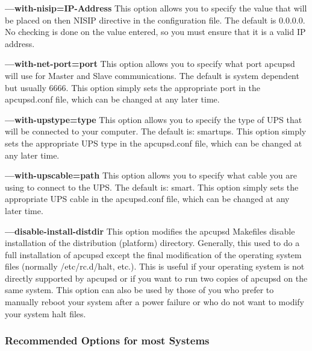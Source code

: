 \begin{description}
\item {\bf {---}with-nisip=\lt{}IP-Address\gt{}}
This option allows you to specify the value that will be placed on then NISIP
directive in the configuration file. The default is 0.0.0.0. No checking is
done on the value entered, so you must ensure that it is a valid IP address.  

\item {\bf {---}with-net-port=\lt{}port\gt{}}
This option allows you to specify what port apcupsd will use for Master and
Slave communications. The default is system dependent but usually 6666. This
option simply sets the appropriate port in the apcupsd.conf file, which can be
changed at any later time.  

\item {\bf {---}with-upstype=\lt{}type\gt{}}
This option allows you to specify the type of UPS that will be connected to
your computer. The default is: smartups. This option simply sets the
appropriate UPS type in the apcupsd.conf file, which can be changed at any
later time.  

\item {\bf {---}with-upscable=\lt{}path\gt{}}
This option allows you to specify what cable you are using to connect to the
UPS. The default is: smart. This option simply sets the appropriate UPS cable
in the apcupsd.conf file, which can be changed at any later time.  

\item {\bf {---}disable-install-distdir}
This option modifies the apcupsd Makefiles disable installation of the
distribution (platform) directory. Generally, this used to do a full
installation of apcupsd except the final modification of the operating system
files (normally /etc/rc.d/halt, etc.). This is useful if your operating system
is not directly supported by apcupsd or if you want to run two copies of
apcupsd on the same system. This option can also be used by those of you who
prefer to manually reboot your system after a power failure or who do not want
to modify your system halt files. 
\end{description}

\label{Recommended-Options-for-most-Systems}

\subsubsection*{Recommended Options for most Systems}

